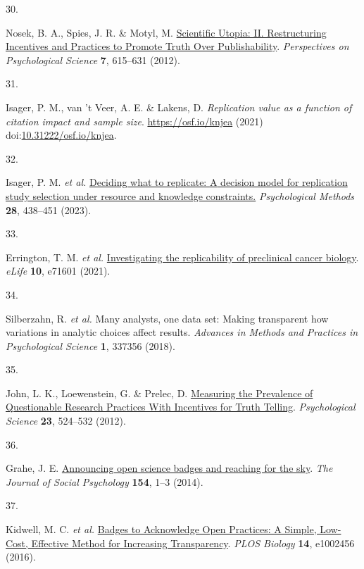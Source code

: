 \documentclass[
  man,floatsintext]{apa6}
\newlength{\cslhangindent}
\newlength{\csllabelwidth}
\newlength{\cslentryspacingunit} %
\newenvironment{CSLReferences}[2] %
 {%
  \setlength{\parindent}{0pt}
  \ifodd #1
  \let\oldpar\par
  \def\par{\hangindent=\cslhangindent\oldpar}
  \fi
  \setlength{\parskip}{#2\cslentryspacingunit}
 }%
 {}
\newcommand{\CSLLeftMargin}[1]{\parbox[t]{\csllabelwidth}{#1}}
\newcommand{\CSLRightInline}[1]{\parbox[t]{\linewidth - \csllabelwidth}{#1}\break}
\begin{document}
\begin{CSLReferences}{0}{0}
\leavevmode{}%
\CSLLeftMargin{30. }%
\CSLRightInline{Nosek, B. A., Spies, J. R. \& Motyl, M. \href{https://doi.org/10.1177/1745691612459058}{Scientific Utopia: II. Restructuring Incentives and Practices to Promote Truth Over Publishability}. \emph{Perspectives on Psychological Science} \textbf{7}, 615--631 (2012).}

\leavevmode{}%
\CSLLeftMargin{31. }%
\CSLRightInline{Isager, P. M., van 't Veer, A. E. \& Lakens, D. \emph{Replication value as a function of citation impact and sample size}. \url{https://osf.io/knjea} (2021) doi:\href{https://doi.org/10.31222/osf.io/knjea}{10.31222/osf.io/knjea}.}

\leavevmode{}%
\CSLLeftMargin{32. }%
\CSLRightInline{Isager, P. M. \emph{et al.} \href{https://doi.org/10.1037/met0000438}{Deciding what to replicate: {A} decision model for replication study selection under resource and knowledge constraints.} \emph{Psychological Methods} \textbf{28}, 438--451 (2023).}

\leavevmode{}%
\CSLLeftMargin{33. }%
\CSLRightInline{Errington, T. M. \emph{et al.} \href{https://doi.org/10.7554/eLife.71601}{Investigating the replicability of preclinical cancer biology}. \emph{eLife} \textbf{10}, e71601 (2021).}

\leavevmode{}%
\CSLLeftMargin{34. }%
\CSLRightInline{Silberzahn, R. \emph{et al.} Many analysts, one data set: Making transparent how variations in analytic choices affect results. \emph{Advances in Methods and Practices in Psychological Science} \textbf{1}, 337356 (2018).}

\leavevmode{}%
\CSLLeftMargin{35. }%
\CSLRightInline{John, L. K., Loewenstein, G. \& Prelec, D. \href{https://doi.org/10.1177/0956797611430953}{Measuring the Prevalence of Questionable Research Practices With Incentives for Truth Telling}. \emph{Psychological Science} \textbf{23}, 524--532 (2012).}

\leavevmode{}%
\CSLLeftMargin{36. }%
\CSLRightInline{Grahe, J. E. \href{https://doi.org/10.1080/00224545.2014.853582}{Announcing open science badges and reaching for the sky}. \emph{The Journal of Social Psychology} \textbf{154}, 1--3 (2014).}

\leavevmode{}%
\CSLLeftMargin{37. }%
\CSLRightInline{Kidwell, M. C. \emph{et al.} \href{https://doi.org/10.1371/journal.pbio.1002456}{Badges to Acknowledge Open Practices: A Simple, Low-Cost, Effective Method for Increasing Transparency}. \emph{PLOS Biology} \textbf{14}, e1002456 (2016).}


\end{CSLReferences}
\end{document}
